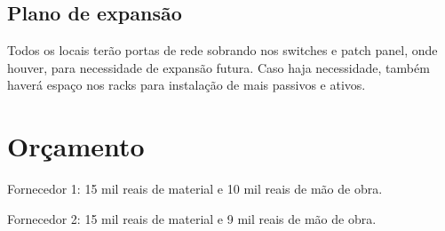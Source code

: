 \documentclass[	DIV=calc,%
							paper=a4,%
							fontsize=12pt,%
							onecolumn]{scrartcl}	 					%
\begin{document}
\subsection{Plano de expansão}
Todos os locais terão portas de rede sobrando nos switches e patch panel, onde houver, para necessidade de expansão futura. Caso haja necessidade, também haverá espaço nos racks para instalação de mais passivos e ativos.

\section{Orçamento}
Fornecedor 1: 15 mil reais de material e 10 mil reais de mão de obra.


Fornecedor 2: 15 mil reais de material e 9 mil reais de mão de obra.
\end{document}
